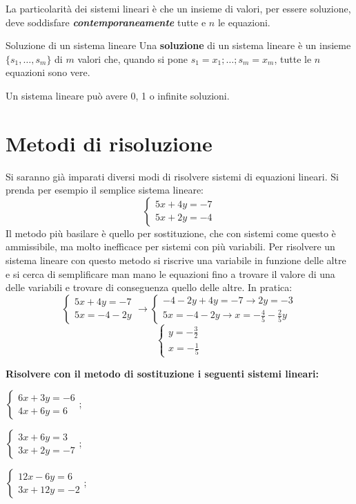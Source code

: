 La particolarità dei sistemi lineari è che un insieme di valori, per essere soluzione, deve soddisfare \textbf{\textit{contemporaneamente}} tutte e $n$ le equazioni.

\begin{newdef}{Soluzione di un sistema lineare}
    Una \textbf{soluzione} di un sistema lineare è un insieme $\{s_1, \dots, s_m\}$ di $m$ valori che, quando si pone $s_1 = x_1; \dots; s_m = x_m$, tutte le $n$ equazioni sono vere.

    Un sistema lineare può avere 0, 1 o infinite soluzioni.
\end{newdef}

\section{Metodi di risoluzione}
Si saranno già imparati diversi modi di risolvere sistemi di equazioni lineari. Si prenda per esempio il semplice sistema lineare:
\[
    \begin{cases}
        5x + 4y = -7 \\
        5x + 2y = -4
    \end{cases}
\]
Il metodo più basilare è quello per sostituzione, che con sistemi come questo è ammissibile, ma molto inefficace per sistemi con più variabili. Per risolvere un sistema lineare con questo metodo si riscrive una variabile in funzione delle altre e si cerca di semplificare man mano le equazioni fino a trovare il valore di una delle variabili e trovare di conseguenza quello delle altre. In pratica:
\[
    \begin{cases}
        5x + 4y = -7 \\
        5x = -4 - 2y
    \end{cases}
    \rightarrow
    \begin{cases}
        -4 - 2y + 4y = -7 \rightarrow 2y = -3\\
        5x = -4 - 2y \rightarrow x = -\frac{4}{5} - \frac{2}{5}y
    \end{cases}
\]
\[
    \begin{cases}
        y = -\frac{3}{2} \\
        x = -\frac{1}{5}
    \end{cases}
\]

\begin{exer}
    \textbf{Risolvere con il metodo di sostituzione i seguenti sistemi lineari:}

    $
        \begin{cases}
            6x + 3y = -6 \\
            4x + 6y = 6
        \end{cases}
    $;

    $
        \begin{cases}
            3x + 6y = 3 \\
            3x + 2y = -7
        \end{cases}
    $;

    $
        \begin{cases}
            12x - 6y = 6 \\
            3x + 12y = -2
        \end{cases}
    $;
\end{exer}

